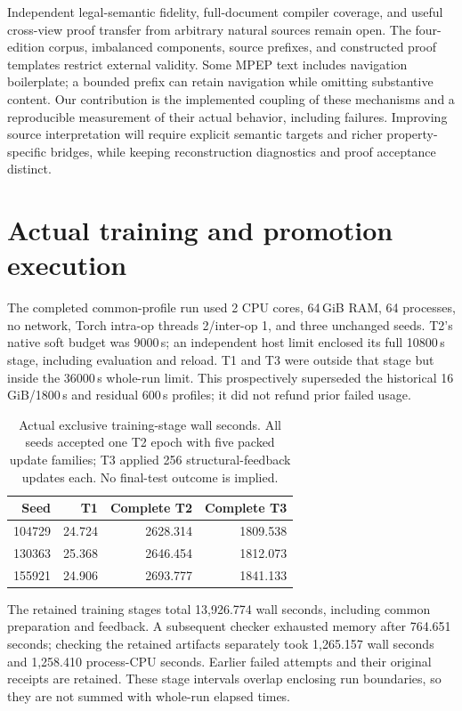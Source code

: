 \documentclass{article}
\begin{document}
Independent legal-semantic fidelity, full-document compiler coverage, and useful cross-view proof transfer from arbitrary natural sources remain open. The four-edition corpus, imbalanced components, source prefixes, and constructed proof templates restrict external validity. Some MPEP text includes navigation boilerplate; a bounded prefix can retain navigation while omitting substantive content. Our contribution is the implemented coupling of these mechanisms and a reproducible measurement of their actual behavior, including failures. Improving source interpretation will require explicit semantic targets and richer property-specific bridges, while keeping reconstruction diagnostics and proof acceptance distinct.\label{af-main-text-end}

\clearpage


\clearpage
\appendix
\section{Actual training and promotion execution}
\label{app:actual-execution}
The completed common-profile run used 2 CPU cores, 64\,GiB RAM, 64 processes, no network, Torch intra-op threads 2/inter-op 1, and three unchanged seeds. T2's native soft budget was 9000\,s; an independent host limit enclosed its full 10800\,s stage, including evaluation and reload. T1 and T3 were outside that stage but inside the 36000\,s whole-run limit. This prospectively superseded the historical 16\,GiB/1800\,s and residual 600\,s profiles; it did not refund prior failed usage.

\begin{table}[h]
\centering\small
\caption{Actual exclusive training-stage wall seconds. All seeds accepted one T2 epoch with five packed update families; T3 applied 256 structural-feedback updates each. No final-test outcome is implied.}
\begin{tabular}{rrrr}\toprule
Seed & T1 & Complete T2 & Complete T3 \\\midrule
104729 & 24.724 & 2628.314 & 1809.538 \\
130363 & 25.368 & 2646.454 & 1812.073 \\
155921 & 24.906 & 2693.777 & 1841.133 \\\bottomrule
\end{tabular}
\end{table}
The retained training stages total 13,926.774 wall seconds, including common preparation and feedback. A subsequent checker exhausted memory after 764.651 seconds; checking the retained artifacts separately took 1,265.157 wall seconds and 1,258.410 process-CPU seconds. Earlier failed attempts and their original receipts are retained. These stage intervals overlap enclosing run boundaries, so they are not summed with whole-run elapsed times.
\end{document}

